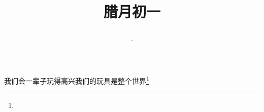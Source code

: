\title{\date[d=31,m=12,y=2024][year:cn-y,年,month:cn,day:cn,日,·,weekday]·腊月初一 }
我们会一辈子玩得高兴我们的玩具是整个世界\footnote{ }

